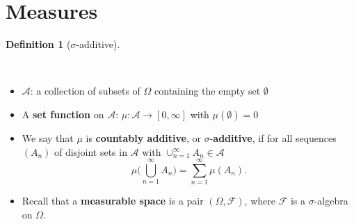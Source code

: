 \documentclass[
  13pt,
  letterpaper,
  DIV=11,
  numbers=noendperiod]{scrreprt}
\providecommand{\tightlist}{%
  \setlength{\itemsep}{0pt}\setlength{\parskip}{0pt}}\usepackage{longtable,booktabs,array}
\theoremstyle{plain}
\theoremstyle{definition}
\theoremstyle{definition}
\newtheorem{definition}{Definition}[chapter]
\theoremstyle{plain}
\theoremstyle{definition}
\theoremstyle{plain}
\theoremstyle{remark}
\begin{document}
\section{Measures}\label{measures}

\begin{definition}[\(\sigma\)-additive]\protect\hypertarget{def-sigmaadditive}{}\label{def-sigmaadditive}

~

\begin{itemize}
\item
  \(\mathcal{A}\): a collection of subsets of \(\Omega\) containing the
  empty set \(\emptyset\)
\item
  A \textbf{set function} on \(\mathcal{A}\):
  \(\mu : \mathcal{A} \rightarrow [0,\infty]\) with
  \(\mu (\emptyset) = 0\)
\item
  We say that \(\mu\) is \textbf{countably additive}, or
  \(\sigma\)-\textbf{additive}, if for all sequences \((A_n)\) of
  disjoint sets in \(\mathcal{A}\) with
  \(\cup_{n=1}^{\infty}A_n \in \mathcal{A}\) \[
  \mu \Big( \bigcup_{n=1}^{\infty} A_n \Big) = \sum_{n=1}^{\infty}\mu (A_n).
  \]
\end{itemize}

\end{definition}

\begin{tcolorbox}[enhanced jigsaw, opacitybacktitle=0.6, bottomrule=.15mm, title=\textcolor{quarto-callout-tip-color}{\faLightbulb}\hspace{0.5em}{Remark}, leftrule=.75mm, rightrule=.15mm, arc=.35mm, left=2mm, titlerule=0mm, colbacktitle=quarto-callout-tip-color!10!white, bottomtitle=1mm, colframe=quarto-callout-tip-color-frame, toptitle=1mm, coltitle=black, breakable, colback=white, toprule=.15mm, opacityback=0]

\begin{itemize}
\tightlist
\item
  Recall that a \textbf{measurable space} is a pair
  \((\Omega, \mathcal{F})\), where \(\mathcal{F}\) is a
  \(\sigma\)-algebra on \(\Omega\).
\end{itemize}

\end{tcolorbox}
\end{document}
